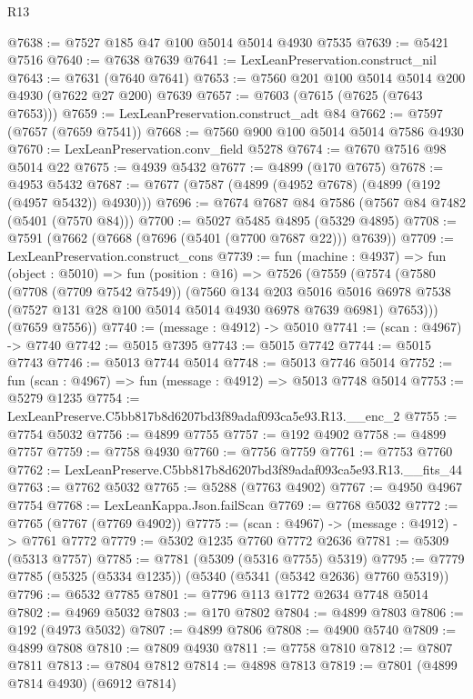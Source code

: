 \begin{lexlean}{R13}
\begin{coremodule}
@7638 := @7527 @185 @47 @100 @5014 @5014 @4930 @7535
@7639 := @5421 @7516
@7640 := @7638 @7639
@7641 := LexLeanPreservation.construct_nil
@7643 := @7631 (@7640 @7641)
@7653 := @7560 @201 @100 @5014 @5014 @200 @4930 (@7622 @27 @200) @7639
@7657 := @7603 (@7615 (@7625 (@7643 @7653)))
@7659 := LexLeanPreservation.construct_adt @84
@7662 := @7597 (@7657 (@7659 @7541))
@7668 := @7560 @900 @100 @5014 @5014 @7586 @4930
@7670 := LexLeanPreservation.conv_field @5278
@7674 := @7670 @7516 @98 @5014 @22
@7675 := @4939 @5432
@7677 := @4899 (@170 @7675)
@7678 := @4953 @5432
@7687 := @7677 (@7587 (@4899 (@4952 @7678) (@4899 (@192 (@4957 @5432)) @4930)))
@7696 := @7674 @7687 @84 @7586 (@7567 @84 @7482 (@5401 (@7570 @84)))
@7700 := @5027 @5485 @4895 (@5329 @4895)
@7708 := @7591 (@7662 (@7668 (@7696 (@5401 (@7700 @7687 @22))) @7639))
@7709 := LexLeanPreservation.construct_cons
@7739 := fun (machine : @4937) =>
  fun (object : @5010) =>
  fun (position : @16) =>
  @7526
    (@7559
      (@7574
        (@7580
          (@7708 (@7709 @7542 @7549))
          (@7560
            @134
            @203
            @5016
            @5016
            @6978
            @7538
            (@7527 @131 @28 @100 @5014 @5014 @4930 @6978 @7639 @6981)
            @7653)))
      (@7659 @7556))
@7740 := (message : @4912) -> @5010
@7741 := (scan : @4967) -> @7740
@7742 := @5015 @7395
@7743 := @5015 @7742
@7744 := @5015 @7743
@7746 := @5013 @7744 @5014
@7748 := @5013 @7746 @5014
@7752 := fun (scan : @4967) => fun (message : @4912) => @5013 @7748 @5014
@7753 := @5279 @1235
@7754 := LexLeanPreserve.C5bb817b8d6207bd3f89adaf093ca5e93.R13.__enc_2
@7755 := @7754 @5032
@7756 := @4899 @7755
@7757 := @192 @4902
@7758 := @4899 @7757
@7759 := @7758 @4930
@7760 := @7756 @7759
@7761 := @7753 @7760
@7762 := LexLeanPreserve.C5bb817b8d6207bd3f89adaf093ca5e93.R13.__fits_44
@7763 := @7762 @5032
@7765 := @5288 (@7763 @4902)
@7767 := @4950 @4967 @7754
@7768 := LexLeanKappa.Json.failScan
@7769 := @7768 @5032
@7772 := @7765 (@7767 (@7769 @4902))
@7775 := (scan : @4967) -> (message : @4912) -> @7761 @7772
@7779 := @5302 @1235 @7760 @7772 @2636
@7781 := @5309 (@5313 @7757)
@7785 := @7781 (@5309 (@5316 @7755) @5319)
@7795 := @7779 @7785 (@5325 (@5334 @1235)) (@5340 (@5341 (@5342 @2636) @7760 @5319))
@7796 := @6532 @7785
@7801 := @7796 @113 @1772 @2634 @7748 @5014
@7802 := @4969 @5032
@7803 := @170 @7802
@7804 := @4899 @7803
@7806 := @192 (@4973 @5032)
@7807 := @4899 @7806
@7808 := @4900 @5740
@7809 := @4899 @7808
@7810 := @7809 @4930
@7811 := @7758 @7810
@7812 := @7807 @7811
@7813 := @7804 @7812
@7814 := @4898 @7813
@7819 := @7801 (@4899 @7814 @4930) (@6912 @7814)

\end{coremodule}
\end{lexlean}
